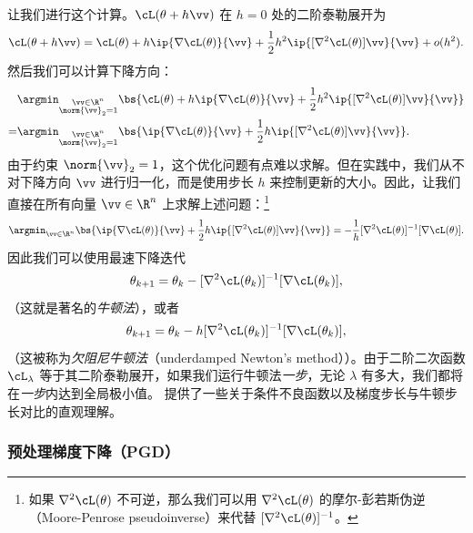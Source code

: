 \documentclass[../../book-main_zh.tex]{subfiles}
\begin{document}
让我们进行这个计算。\(\cL(\theta + h\vv)\) 在 \(h = 0\) 处的二阶泰勒展开为
\begin{equation}
    \cL(\theta + h\vv) = \cL(\theta) + h\ip{\nabla \cL(\theta)}{\vv}
    + \frac{1}{2}h^{2}\ip{[\nabla^{2}\cL(\theta)]\vv}{\vv} + o(h^{2}).
\end{equation}
然后我们可以计算下降方向：
\begin{align}
    &\argmin_{\substack{\vv \in \R^{n} \\ \norm{\vv}_{2} =
    1}}\bs{\cL(\theta) + h\ip{\nabla \cL(\theta)}{\vv} +
    \frac{1}{2}h^{2}\ip{[\nabla^{2}\cL(\theta)]\vv}{\vv}} \\
    =& \argmin_{\substack{\vv \in \R^{n} \\ \norm{\vv}_{2} =
    1}}\bs{\ip{\nabla \cL(\theta)}{\vv} +
    \frac{1}{2}h\ip{[\nabla^{2}\cL(\theta)]\vv}{\vv}}.
\end{align}
由于约束 \(\norm{\vv}_{2} = 1\)，这个优化问题有点难以求解。但在实践中，我们从不对下降方向 \(\vv\) 进行归一化，而是使用步长 \(h\) 来控制更新的大小。因此，让我们直接在所有向量 \(\vv \in \R^{n}\) 上求解上述问题：\footnote{如果 \(\nabla^{2}\cL(\theta)\) 不可逆，那么我们可以用 \(\nabla^{2}\cL(\theta)\) 的摩尔-彭若斯伪逆（Moore-Penrose pseudoinverse）来代替 \([\nabla^{2}\cL(\theta)]^{-1}\)。}
\begin{equation}
    \argmin_{\vv \in \R^{n}}\bs{\ip{\nabla \cL(\theta)}{\vv} +
    \frac{1}{2}h\ip{[\nabla^{2}\cL(\theta)]\vv}{\vv}} =
    -\frac{1}{h}[\nabla^{2}\cL(\theta)]^{-1}[\nabla \cL(\theta)].
\end{equation}
因此我们可以使用最速下降迭代
\begin{equation}
    \theta_{k + 1} = \theta_{k} -
    [\nabla^{2}\cL(\theta_{k})]^{-1}[\nabla \cL(\theta_{k})],
\end{equation}
（这就是著名的\textit{牛顿法}），或者
\begin{equation}
    \theta_{k + 1} = \theta_{k} -
    h[\nabla^{2}\cL(\theta_{k})]^{-1}[\nabla \cL(\theta_{k})],
\end{equation}
（这被称为\textit{欠阻尼牛顿法}（underdamped Newton's method））。由于二阶二次函数 \(\cL_{\lambda}\) 等于其二阶泰勒展开，如果我们运行牛顿法\textit{一步}，无论 \(\lambda\) 有多大，我们都将在\textit{一步}内达到全局极小值。 提供了一些关于条件不良函数以及梯度步长与牛顿步长对比的直观理解。

\subsubsection{预处理梯度下降（PGD）}
\end{document}
